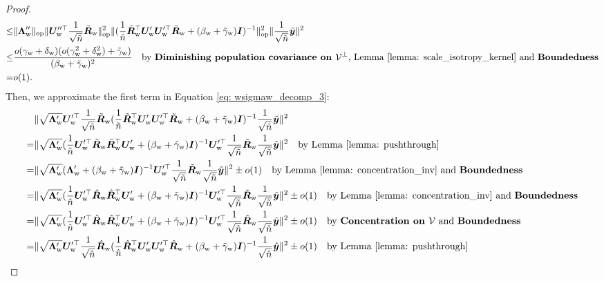 \begin{proof}
\begin{align}
    \leq & \lVert  {\bm{\Lambda}}_{\text{w}}''  \rVert_{\mathrm{op}}\lVert  {\bm{U}}_{\text{w}}''^\top \frac{1}{\sqrt{\tilde{n}}}\tilde{{\bm{R}}}_{\text{w}}   \rVert_{\mathrm{op}}^2 \lVert  (\frac{1}{\tilde{n}}\tilde{{\bm{R}}}_{\text{w}}^\top {\bm{U}}_{\text{w}}'{\bm{U}}_{\text{w}}'^\top \tilde{{\bm{R}}}_{\text{w}} + (\beta_{\text{w}}+\tilde{\gamma}_{\text{w}}){\bm{I}} )^{-1} \rVert_{\mathrm{op}}^2  \|\frac{1}{\sqrt{\tilde{n}}}\tilde{{\bm{y}}}  \|^2 \\
    \nonumber
    \leq & \frac{o( \gamma_{\text{w}} +\delta_{\text{w}} ) (o(\gamma_{\text{w}}^2+\delta_{\text{w}}^2)+\tilde{\gamma}_{\text{w}})}{(\beta_{\text{w}}+\tilde{\gamma}_{\text{w}})^2}    \quad\text{by \textbf{Diminishing population covariance on ${\mathcal{V}}^\perp$}{}, Lemma \ref{lemma: scale_isotropy_kernel} and \textbf{Boundedness}{}}\\
    \label{wsigma_term_2}
    = & o(1).
\end{align}
Then, we approximate the first term in Equation \ref{eq: wsigmaw_decomp_3}:
\begin{align}
    \nonumber
   &  \| \sqrt{\mLambda_\w'}\mU_\w'^\top \frac{1}{\sqrt{\tilde{n}}}\tilde{\mR}_\w (\frac{1}{\tilde{n}}\tilde{\mR}_\w^\top \mU_\w'\mU_\w'^\top \tilde{\mR}_\w + (\beta_\w+\tilde{\gamma}_\w)\mI )^{-1}\frac{1}{\sqrt{\tilde{n}}}\tilde{\vy} \|^2 \\
    \nonumber
   = & \| \sqrt{\mLambda_\w'} (\frac{1}{\tilde{n}}\mU_\w'^\top \tilde{\mR}_\w\tilde{\mR}_\w^\top \mU_\w' + (\beta_\w+\tilde{\gamma}_\w)\mI )^{-1} \mU_\w'^\top \frac{1}{\sqrt{\tilde{n}}}\tilde{\mR}_\w\frac{1}{\sqrt{\tilde{n}}}\tilde{\vy} \|^2 \quad\text{by Lemma \ref{lemma: pushthrough}}\\
   \nonumber
   = & \| \sqrt{\mLambda_\w'}(\mLambda_\w' + (\beta_\w+\tilde{\gamma}_\w)\mI )^{-1} \mU_\w'^\top\frac{1}{\sqrt{\tilde{n}}}\tilde{\mR}_\w\frac{1}{\sqrt{\tilde{n}}}\tilde{\vy} \|^2 \pm o(1) \quad\text{by Lemma \ref{lemma: concentration_inv} and \bounded{}}\\
   \nonumber
   = & \| \sqrt{\mLambda_\w'} (\frac{1}{\hat{n}}\mU_\w'^\top \hat{\mR}_\w\hat{\mR}_\w^\top \mU_\w' + (\beta_\w+\tilde{\gamma}_\w)\mI )^{-1} \mU_\w'^\top\frac{1}{\sqrt{\tilde{n}}}\tilde{\mR}_\w\frac{1}{\sqrt{\tilde{n}}}\tilde{\vy} \|^2\pm o(1) \quad\text{by Lemma \ref{lemma: concentration_inv} and \bounded{}} \\
   \nonumber
   = & \| \sqrt{\mLambda_\w'} (\frac{1}{\hat{n}}\mU_\w'^\top \hat{\mR}_\w\hat{\mR}_\w^\top \mU_\w' + (\beta_\w+\tilde{\gamma}_\w)\mI )^{-1} \mU_\w'^\top\frac{1}{\sqrt{\hat{n}}}\hat{\mR}_\w\frac{1}{\sqrt{\hat{n}}}\hat{\vy} \|^2 \pm o(1) \quad\text{by \conc{} and \bounded{}}\\
   \nonumber
   = & \| \sqrt{\mLambda_\w'} \mU_\w'^\top\frac{1}{\sqrt{\hat{n}}}\hat{\mR}_\w(\frac{1}{\hat{n}}\hat{\mR}_\w^\top \mU_\w'\mU_\w'^\top \hat{\mR}_\w + (\beta_\w+\tilde{\gamma}_\w)\mI )^{-1} \frac{1}{\sqrt{\hat{n}}}\hat{\vy} \|^2 \pm o(1)\quad\text{by Lemma \ref{lemma: pushthrough}}\\

\end{align}
\end{proof}
